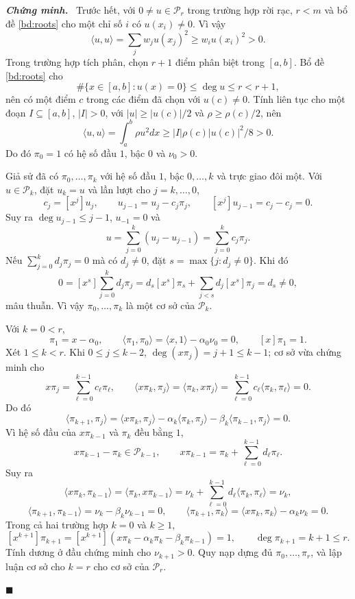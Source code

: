 \documentclass[12pt,a4paper,oneside]{book}
\numberwithin{algorithm}{chapter}
\theoremstyle{definition}
\newenvironment{chungminh}{\par\medskip\noindent\textbf{\textit{\color{mainblue}Chứng minh.}}\ }{\hfill$\blacksquare$\par\medskip}
\begin{document}
\begin{chungminh}
Trước hết, với $0\ne u\in\mathcal P_r$ trong trường hợp rời rạc, $r<m$ và bổ đề \ref{bd:roots} cho một chỉ số $i$ có $u(x_i)\ne0$. Vì vậy
\[
 \langle u,u\rangle=\sum_jw_ju(x_j)^2
 \geq w_i u(x_i)^2>0.
\]
Trong trường hợp tích phân, chọn $r+1$ điểm phân biệt trong $[a,b]$. Bổ đề \ref{bd:roots} cho
\[
 \#\{x\in[a,b]:u(x)=0\}\leq\deg u\leq r<r+1,
\]
nên có một điểm $c$ trong các điểm đã chọn với $u(c)\ne0$. Tính liên tục cho một đoạn $I\subseteq[a,b]$, $|I|>0$, với $|u|\geq|u(c)|/2$ và $\rho\geq\rho(c)/2$, nên
\[
 \langle u,u\rangle=\int_a^b\rho u^2dx
 \geq |I|\rho(c)|u(c)|^2/8>0.
\]
Do đó $\pi_0=1$ có hệ số đầu $1$, bậc $0$ và $\nu_0>0$.

Giả sử đã có $\pi_0,\ldots,\pi_k$ với hệ số đầu $1$, bậc $0,\ldots,k$ và trực giao đôi một. Với $u\in\mathcal P_k$, đặt $u_k=u$ và lần lượt cho $j=k,\ldots,0$,
\[
 c_j=[x^j]u_j,\qquad u_{j-1}=u_j-c_j\pi_j,\qquad
 [x^j]u_{j-1}=c_j-c_j=0.
\]
Suy ra $\deg u_{j-1}\leq j-1$, $u_{-1}=0$ và
\[
 u=\sum_{j=0}^k(u_j-u_{j-1})=\sum_{j=0}^kc_j\pi_j.
\]
Nếu $\sum_{j=0}^kd_j\pi_j=0$ mà có $d_j\ne0$, đặt $s=\max\{j:d_j\ne0\}$. Khi đó
\[
 0=[x^s]\sum_{j=0}^kd_j\pi_j
 =d_s[x^s]\pi_s+\sum_{j<s}d_j[x^s]\pi_j
 =d_s\ne0,
\]
mâu thuẫn. Vì vậy $\pi_0,\ldots,\pi_k$ là một cơ sở của $\mathcal P_k$.

Với $k=0<r$,
\[
 \pi_1=x-\alpha_0,\qquad
 \langle\pi_1,\pi_0\rangle
 =\langle x,1\rangle-\alpha_0\nu_0=0,\qquad
 [x]\pi_1=1.
\]
Xét $1\leq k<r$. Khi $0\leq j\leq k-2$, $\deg(x\pi_j)=j+1\leq k-1$; cơ sở vừa chứng minh cho
\[
 x\pi_j=\sum_{\ell=0}^{k-1}c_\ell\pi_\ell,\qquad
 \langle x\pi_k,\pi_j\rangle
 =\langle\pi_k,x\pi_j\rangle
 =\sum_{\ell=0}^{k-1}c_\ell\langle\pi_k,\pi_\ell\rangle=0.
\]
Do đó
\[
 \langle\pi_{k+1},\pi_j\rangle
 =\langle x\pi_k,\pi_j\rangle
 -\alpha_k\langle\pi_k,\pi_j\rangle
 -\beta_k\langle\pi_{k-1},\pi_j\rangle=0.
\]
Vì hệ số đầu của $x\pi_{k-1}$ và $\pi_k$ đều bằng $1$,
\[
 x\pi_{k-1}-\pi_k\in\mathcal P_{k-1},\qquad
 x\pi_{k-1}=\pi_k+\sum_{\ell=0}^{k-1}d_\ell\pi_\ell.
\]
Suy ra
\[
 \langle x\pi_k,\pi_{k-1}\rangle
 =\langle\pi_k,x\pi_{k-1}\rangle
 =\nu_k+\sum_{\ell=0}^{k-1}d_\ell\langle\pi_k,\pi_\ell\rangle
 =\nu_k,
\]
\[
 \langle\pi_{k+1},\pi_{k-1}\rangle
 =\nu_k-\beta_k\nu_{k-1}=0,\qquad
 \langle\pi_{k+1},\pi_k\rangle
 =\langle x\pi_k,\pi_k\rangle-\alpha_k\nu_k=0.
\]
Trong cả hai trường hợp $k=0$ và $k\geq1$,
\[
 [x^{k+1}]\pi_{k+1}
 =[x^{k+1}](x\pi_k-\alpha_k\pi_k-\beta_k\pi_{k-1})=1,
 \qquad \deg\pi_{k+1}=k+1\leq r.
\]
Tính dương ở đầu chứng minh cho $\nu_{k+1}>0$. Quy nạp dựng đủ $\pi_0,\ldots,\pi_r$, và lập luận cơ sở cho $k=r$ cho cơ sở của $\mathcal P_r$.


\end{chungminh}
\end{document}
